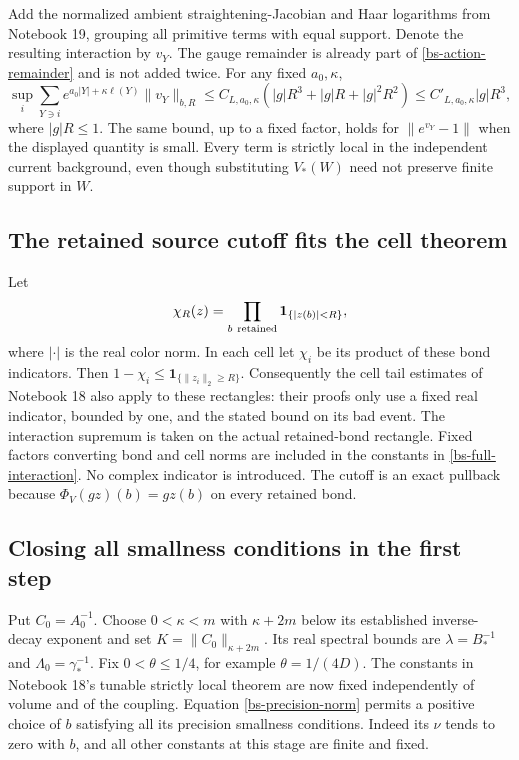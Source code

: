 Add the normalized ambient straightening-Jacobian and Haar
logarithms from Notebook 19, grouping all primitive terms with
equal support. Denote the resulting interaction by $v_Y$.
The gauge remainder is already part of
\eqref{bs-action-remainder} and is not added twice. For any
fixed $a_0,\kappa$,
\begin{equation}\label{bs-full-interaction}
 \sup_i\sum_{Y\ni i} e^{a_0|Y|+\kappa\ell(Y)}
           \|v_Y\|_{b,R}
 \le C_{L,a_0,\kappa}
       (|g|R^3+|g|R+|g|^2R^2)
 \le C'_{L,a_0,\kappa}|g|R^3,
\end{equation}
where $|g|R\le1$. The same bound, up to a fixed factor,
holds for $\|e^{v_Y}-1\|$ when the displayed quantity is
small. Every term is strictly local in the independent current
background, even though substituting $V_*(W)$ need not preserve
finite support in $W$.

\subsection{The retained source cutoff fits the cell theorem}

Let
\begin{equation}\label{bs-cutoff}
 \chi_R(z)=\prod_{b\ {\rm retained}}\mathbf1_{\{|z(b)|<R\}},
\end{equation}
where $|\cdot|$ is the real color norm. In each cell let $\chi_i$
be its product of these bond indicators. Then
$1-\chi_i\le\mathbf1_{\{\|z_i\|_2\ge R\}}$.
Consequently the cell tail estimates of Notebook 18 also apply
to these rectangles: their proofs only use a fixed real
indicator, bounded by one, and the stated bound on its bad
event. The interaction supremum is taken on the actual
retained-bond rectangle. Fixed factors converting bond and
cell norms are included in the constants in
\eqref{bs-full-interaction}. No complex indicator is introduced.
The cutoff is an exact pullback because
$\Phi_V(gz)(b)=gz(b)$ on every retained bond.

\subsection{Closing all smallness conditions in the first step}

Put $C_0=A_0^{-1}$. Choose $0<\kappa<m$ with
$\kappa+2m$ below its established inverse-decay exponent and
set $K=\|C_0\|_{\kappa+2m}$. Its real spectral bounds are
$\lambda=B_*^{-1}$ and $\Lambda_0=\gamma_*^{-1}$.
Fix $0<\theta\le1/4$, for example $\theta=1/(4D)$.
The constants in Notebook 18's tunable strictly local theorem
are now fixed independently of volume and of the coupling.
Equation \eqref{bs-precision-norm} permits a positive choice
of $b$ satisfying all its precision smallness conditions.
Indeed its $\nu$ tends to zero with $b$, and all other
constants at this stage are finite and fixed.

